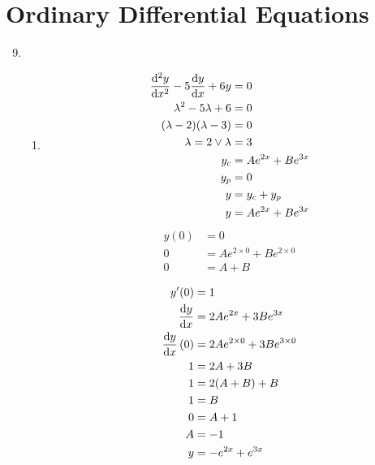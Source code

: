\documentclass[10pt,\jkfside,a4paper]{article}
\begin{document}
\section*{Ordinary Differential Equations}

\begin{enumerate}
\setcounter{enumi}{8}

\item
\begin{enumerate}

\item
\begin{equation}
\begin{split}
\dv[2]{y}{x} - 5\dv{y}{x} + 6y &= 0\\
\lambda^2 - 5\lambda + 6 &= 0\\
(\lambda - 2)(\lambda - 3) &= 0\\
\lambda = 2 \vee \lambda &= 3\\
y_c &= Ae^{2x} + Be^{3x}\\
y_p &= 0 \\
y &= y_c + y_p \\
y &= Ae^{2x} + Be^{3x}\\
\end{split}
\end{equation}
\begin{equation}
\begin{split}
y(0) &= 0\\
0 &= Ae^{2\times 0} + Be^{2 \times 0}\\
0 &= A + B\\
\end{split}
\end{equation}
\begin{equation}
\begin{split}
y'(0) &= 1\\
\dv{y}{x} &= 2Ae^{2x} + 3Be^{3x} \\
\dv{y}{x}\left(0\right) &= 2Ae^{2 \times 0} + 3Be^{3 \times 0} \\
1 &= 2A + 3B \\
1 &= 2(A + B) + B \\
1 &= B \\
0 &= A + 1 \\
A &= -1 \\
y &= -e^{2x} + e^{3x} \\
\end{split}
\end{equation}


\end{enumerate}
\end{enumerate}
\end{document}

